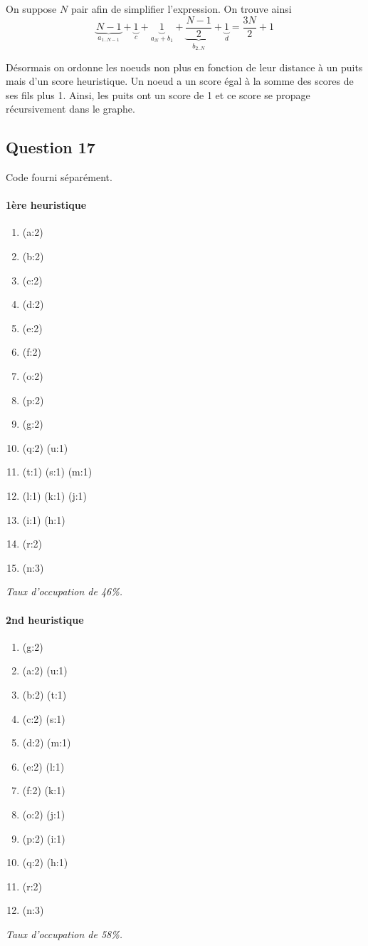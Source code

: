 \documentclass[11pt]{article}
\newenvironment{titledenumerate}[1]
  {\paragraph{#1} \begin{enumerate}}
  {\end{enumerate}}
\begin{document}
    On suppose $N$ pair afin de simplifier l'expression. On trouve ainsi
    \[ \underbrace{N-1}_{a_{1..N-1}} + \underbrace{1}_{c} + \underbrace{1}_{a_N
    + b_1} + \underbrace{\frac{N-1}{2}}_{b_{2..N}} + \underbrace{1}_{d} =
    \frac{3N}{2} + 1 \]

    Désormais on ordonne les noeuds non plus en fonction de leur
    distance à un puits mais d'un score heuristique. Un noeud a un score égal à
    la somme des scores de ses fils plus 1. Ainsi, les puits ont un score de 1
    et ce score se propage récursivement dans le graphe.

    \newpage
  \subsection{Question 17}
    Code fourni séparément.

    \begin{multicols}{2}
      \begin{titledenumerate}{1ère heuristique}
        \item (a:2)
        \item (b:2)
        \item (c:2)
        \item (d:2)
        \item (e:2)
        \item (f:2)
        \item (o:2)
        \item (p:2)
        \item (g:2)
        \item (q:2) (u:1)
        \item (t:1) (s:1) (m:1)
        \item (l:1) (k:1) (j:1)
        \item (i:1) (h:1)
        \item (r:2)
        \item (n:3)
      \end{titledenumerate}
      \emph{Taux d'occupation de 46\%.}

      \begin{titledenumerate}{2nd heuristique}
        \item (g:2)
        \item (a:2) (u:1)
        \item (b:2) (t:1)
        \item (c:2) (s:1)
        \item (d:2) (m:1)
        \item (e:2) (l:1)
        \item (f:2) (k:1)
        \item (o:2) (j:1)
        \item (p:2) (i:1)
        \item (q:2) (h:1)
        \item (r:2)
        \item (n:3)
      \end{titledenumerate}
      \emph{Taux d'occupation de 58\%.}
    \end{multicols}
\end{document}
